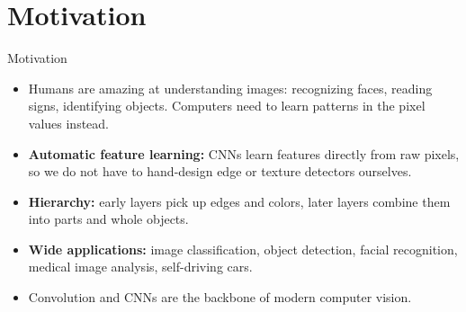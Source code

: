 \section{Motivation}

\begin{frame}{Motivation}
    \begin{itemize}
        \item Humans are amazing at understanding images: recognizing faces, reading signs, identifying objects. Computers need to learn patterns in the pixel values instead.
        \item \textbf{Automatic feature learning:} CNNs learn features directly from raw pixels, so we do not have to hand-design edge or texture detectors ourselves.
        \item \textbf{Hierarchy:} early layers pick up edges and colors, later layers combine them into parts and whole objects.
        \item \textbf{Wide applications:} image classification, object detection, facial recognition, medical image analysis, self-driving cars.
        \item Convolution and CNNs are the backbone of modern computer vision.
    \end{itemize}
\end{frame}

